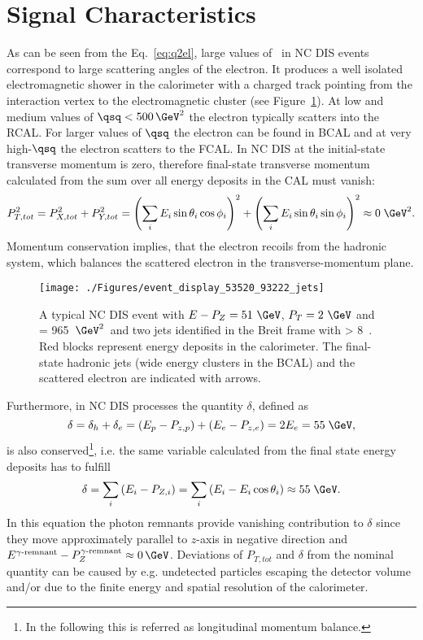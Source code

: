 \section{Signal Characteristics}
\label{sec:signalchar}
As can be seen from the Eq.~\eqref{eq:q2el}, large values of \qsq\, in NC DIS events correspond to large scattering angles of the electron. It produces a well isolated electromagnetic shower in the calorimeter with a charged track pointing from the interaction vertex to the electromagnetic cluster (see Figure~\ref{fig:ncdiseventdisplay}). At low and medium values of $\qsq < 500\, \GeV^2$ the electron typically scatters into the RCAL. For larger values of $\qsq$ the electron can be found in BCAL and at very high-$\qsq$ the electron scatters to the FCAL. In NC DIS at \hera the initial-state transverse momentum is zero, therefore final-state transverse momentum calculated from the sum over all energy deposits in the CAL must vanish:
\begin{equation}
P_{T,tot}^2 = P_{X,tot}^2+P_{Y,tot}^2 = \left(\sum_i{E_i\sin{\theta_i}\cos{\phi_i}}\right)^2 + \left(\sum_i{E_i\sin{\theta_i}\sin{\phi_i}}\right)^2 \approx 0\;\GeV^2.
\end{equation}
 Momentum conservation implies, that the electron recoils from the hadronic system, which balances the scattered electron in the transverse-momentum plane.
\begin{figure}[htbp]
	\centering
	\texttt{[image: ./Figures/event\_display\_53520\_93222\_jets]} 
	\caption{A typical NC DIS event with $E-P_Z=51~\GeV$, $P_T=2~\GeV$ and \qsq = 965~$\GeV^2$~and two jets identified in the Breit frame with \etjetb> 8~\GeV. Red blocks represent energy deposits in the calorimeter. The final-state hadronic jets (wide energy clusters in the BCAL) and the scattered electron are indicated with arrows.}
	\label{fig:ncdiseventdisplay}
\end{figure}

Furthermore, in NC DIS processes the quantity $\delta$, defined as
\begin{equation}
\delta = \delta_h + \delta_e = \left( E_p - P_{z,p} \right) + \left( E_e - P_{z,e}\right) = 2E_e = 55\;\GeV,
\label{eq:deltadis}
\end{equation}
is also conserved\footnote{In the following this is referred as longitudinal momentum balance.}, i.e. the same variable calculated from the final state energy deposits has to fulfill
\begin{equation}
\delta = \sum_i{\left(E_i - P_{Z,i}\right)} = \sum_i{\left(E_i - E_i\cos{\theta_i}\right)} \approx 55\;\GeV.
\end{equation}
In this equation the photon remnants provide vanishing contribution to $\delta$ since they move approximately parallel to $z$-axis in negative direction and $E^{\gamma\text{-remnant}}-P_{Z}^{\gamma\text{-remnant}} \approx 0\,\GeV$. Deviations of $P_{T,tot}$ and $\delta$ from the nominal quantity can be caused by e.g. undetected particles escaping the  detector volume and/or due to the finite energy and spatial resolution of the calorimeter.

